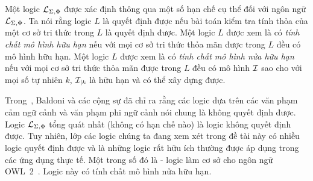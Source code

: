Một logic $\mathcal{L}_{\Sigma,\Phi}$ được xác định thông qua một số hạn chế cụ thể đối với ngôn ngữ $\mathcal{L}_{\Sigma,\Phi}$. Ta nói rằng logic $L$ là quyết định được nếu bài toán kiểm tra tính thỏa của một cơ sở tri thức trong $L$ là quyết định được. 
%
Một logic $L$ được xem là có {\em tính chất mô hình hữu hạn} nếu với mọi cơ sở tri thức thỏa mãn được trong $L$ đều có mô hình hữu hạn.
%
Một logic $L$ được xem là có {\em tính chất mô hình nửa hữu hạn} nếu với mọi cơ sở tri thức thỏa mãn được trong $L$ đều có mô hình $\mathcal{I}$ sao cho với mọi số tự nhiên $k$, $\mathcal{I}_{\mid k}$ là hữu hạn và có thể xây dựng được.

Trong~\cite{Baldoni1998}, Baldoni và các cộng sự đã chỉ ra rằng các logic dựa trên các văn phạm cảm ngữ cảnh và văn phạm phi ngữ cảnh nói chung là không quyết định được.
Logic $\mathcal{L}_{\Sigma,\Phi}$ tổng quát nhất (không có hạn chế nào) là logic không quyết định được. Tuy nhiên, lớp các logic chúng ta đang xem xét trong đề tài này có nhiều logic quyết định được và là những logic rất hữu ích thường được áp dụng trong các ứng dụng thực tế. Một trong số đó là \SROIQ\;- logic làm cơ sở cho ngôn ngữ OWL~2~\cite{Horrocks2006}. Logic này có tính chất mô hình nửa hữu hạn.

